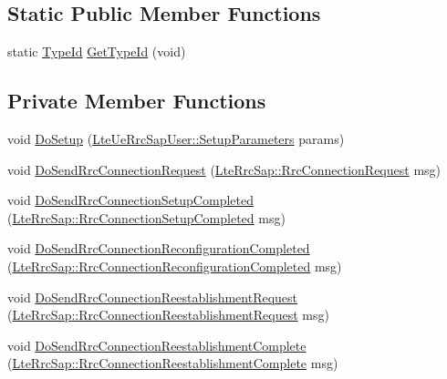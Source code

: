 \subsection*{Static Public Member Functions}
\begin{DoxyCompactItemize}
\item 
static \hyperlink{classns3_1_1TypeId}{Type\+Id} \hyperlink{classns3_1_1MmWaveLteUeRrcProtocolReal_ab7fac1dfd6b20d7b4d2cb36be6102b00}{Get\+Type\+Id} (void)
\end{DoxyCompactItemize}
\subsection*{Private Member Functions}
\begin{DoxyCompactItemize}
\item 
void \hyperlink{classns3_1_1MmWaveLteUeRrcProtocolReal_aae526da15fb6d2c7ae4e365e7702f458}{Do\+Setup} (\hyperlink{structns3_1_1LteUeRrcSapUser_1_1SetupParameters}{Lte\+Ue\+Rrc\+Sap\+User\+::\+Setup\+Parameters} params)
\item 
void \hyperlink{classns3_1_1MmWaveLteUeRrcProtocolReal_a02fda6186d43188464181236922ab8c8}{Do\+Send\+Rrc\+Connection\+Request} (\hyperlink{structns3_1_1LteRrcSap_1_1RrcConnectionRequest}{Lte\+Rrc\+Sap\+::\+Rrc\+Connection\+Request} msg)
\item 
void \hyperlink{classns3_1_1MmWaveLteUeRrcProtocolReal_a8fb76c749b0546c712bb01bde8286d81}{Do\+Send\+Rrc\+Connection\+Setup\+Completed} (\hyperlink{structns3_1_1LteRrcSap_1_1RrcConnectionSetupCompleted}{Lte\+Rrc\+Sap\+::\+Rrc\+Connection\+Setup\+Completed} msg)
\item 
void \hyperlink{classns3_1_1MmWaveLteUeRrcProtocolReal_aea3f08380821000ed2c5d6f94482bdd6}{Do\+Send\+Rrc\+Connection\+Reconfiguration\+Completed} (\hyperlink{structns3_1_1LteRrcSap_1_1RrcConnectionReconfigurationCompleted}{Lte\+Rrc\+Sap\+::\+Rrc\+Connection\+Reconfiguration\+Completed} msg)
\item 
void \hyperlink{classns3_1_1MmWaveLteUeRrcProtocolReal_a8897d1f95d113412a29acdc0e27eae41}{Do\+Send\+Rrc\+Connection\+Reestablishment\+Request} (\hyperlink{structns3_1_1LteRrcSap_1_1RrcConnectionReestablishmentRequest}{Lte\+Rrc\+Sap\+::\+Rrc\+Connection\+Reestablishment\+Request} msg)
\item 
void \hyperlink{classns3_1_1MmWaveLteUeRrcProtocolReal_a82ddc2f96dbd4457621337be5d465124}{Do\+Send\+Rrc\+Connection\+Reestablishment\+Complete} (\hyperlink{structns3_1_1LteRrcSap_1_1RrcConnectionReestablishmentComplete}{Lte\+Rrc\+Sap\+::\+Rrc\+Connection\+Reestablishment\+Complete} msg)

\end{DoxyCompactItemize}
